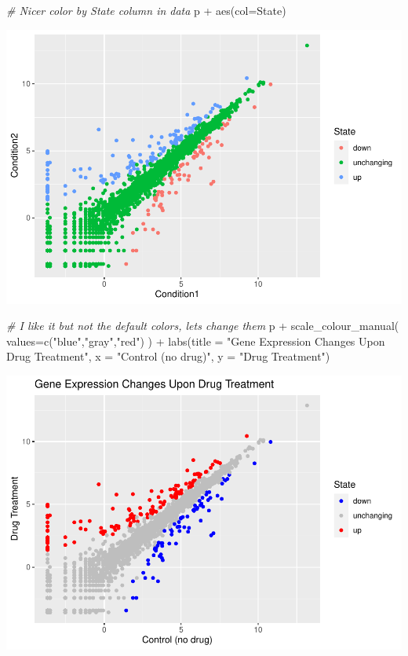 \documentclass[
]{article}
\newenvironment{Shaded}{\begin{snugshade}}{\end{snugshade}}
\newcommand{\AttributeTok}[1]{\textcolor[rgb]{0.77,0.63,0.00}{#1}}
\newcommand{\CommentTok}[1]{\textcolor[rgb]{0.56,0.35,0.01}{\textit{#1}}}
\newcommand{\FunctionTok}[1]{\textcolor[rgb]{0.00,0.00,0.00}{#1}}
\newcommand{\NormalTok}[1]{#1}
\newcommand{\SpecialCharTok}[1]{\textcolor[rgb]{0.00,0.00,0.00}{#1}}
\newcommand{\StringTok}[1]{\textcolor[rgb]{0.31,0.60,0.02}{#1}}
\begin{document}
\begin{Shaded}
\begin{Highlighting}[]
\CommentTok{\# Nicer color by State column in data}
\NormalTok{p }\SpecialCharTok{+} \FunctionTok{aes}\NormalTok{(}\AttributeTok{col=}\NormalTok{State)}
\end{Highlighting}
\end{Shaded}

\includegraphics{class05_files/figure-latex/unnamed-chunk-1-4.pdf}

\begin{Shaded}
\begin{Highlighting}[]
\CommentTok{\# I like it but not the default colors, let\textquotesingle{}s change them}
\NormalTok{p }\SpecialCharTok{+} \FunctionTok{scale\_colour\_manual}\NormalTok{( }\AttributeTok{values=}\FunctionTok{c}\NormalTok{(}\StringTok{"blue"}\NormalTok{,}\StringTok{"gray"}\NormalTok{,}\StringTok{"red"}\NormalTok{) ) }\SpecialCharTok{+} 
\FunctionTok{labs}\NormalTok{(}\AttributeTok{title =} \StringTok{"Gene Expression Changes Upon Drug Treatment"}\NormalTok{,}
     \AttributeTok{x =} \StringTok{"Control (no drug)"}\NormalTok{,}
     \AttributeTok{y =} \StringTok{"Drug Treatment"}\NormalTok{)}
\end{Highlighting}
\end{Shaded}

\includegraphics{class05_files/figure-latex/unnamed-chunk-1-5.pdf}
\end{document}
